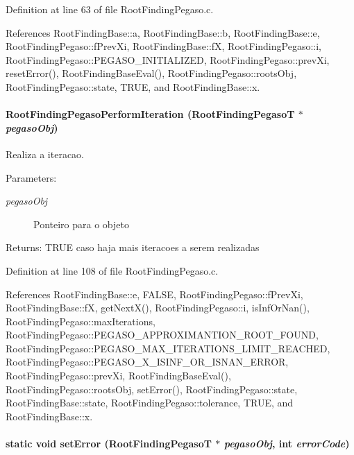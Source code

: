 Definition at line 63 of file RootFindingPegaso.c.

References RootFindingBase::a, RootFindingBase::b, RootFindingBase::e, RootFindingPegaso::fPrevXi, RootFindingBase::fX, RootFindingPegaso::i, RootFindingPegaso::PEGASO\_\-INITIALIZED, RootFindingPegaso::prevXi, resetError(), RootFindingBaseEval(), RootFindingPegaso::rootsObj, RootFindingPegaso::state, TRUE, and RootFindingBase::x.\hypertarget{group____pegaso_g983282553d9cd96ebd2155b5f939aada}{
\paragraph[RootFindingPegasoPerformIteration]{ RootFindingPegasoPerformIteration ({\bf RootFindingPegasoT} $\ast$ {\em pegasoObj})}\hfill}
\label{group____pegaso_g983282553d9cd96ebd2155b5f939aada}


Realiza a iteracao. 

\begin{Desc}
\item[Parameters:]
\begin{description}
\item[{\em pegasoObj}]Ponteiro para o objeto \end{description}
\end{Desc}
\begin{Desc}
\item[Returns:]TRUE caso haja mais iteracoes a serem realizadas \end{Desc}


Definition at line 108 of file RootFindingPegaso.c.

References RootFindingBase::e, FALSE, RootFindingPegaso::fPrevXi, RootFindingBase::fX, getNextX(), RootFindingPegaso::i, isInfOrNan(), RootFindingPegaso::maxIterations, RootFindingPegaso::PEGASO\_\-APPROXIMANTION\_\-ROOT\_\-FOUND, RootFindingPegaso::PEGASO\_\-MAX\_\-ITERATIONS\_\-LIMIT\_\-REACHED, RootFindingPegaso::PEGASO\_\-X\_\-ISINF\_\-OR\_\-ISNAN\_\-ERROR, RootFindingPegaso::prevXi, RootFindingBaseEval(), RootFindingPegaso::rootsObj, setError(), RootFindingPegaso::state, RootFindingBase::state, RootFindingPegaso::tolerance, TRUE, and RootFindingBase::x.\hypertarget{group____pegaso_g755ddb4e92d010ac22e88d32e7fcec6f}{
\paragraph[setError]{\setlength{\rightskip}{0pt plus 5cm}static void setError ({\bf RootFindingPegasoT} $\ast$ {\em pegasoObj}, \/  int {\em errorCode})}\hfill}
\label{group____pegaso_g755ddb4e92d010ac22e88d32e7fcec6f}


